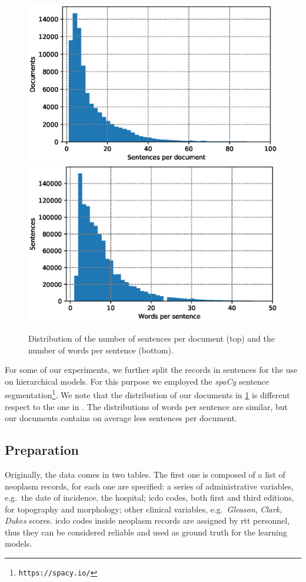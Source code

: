 \begin{figure}
  \centering
  \includegraphics[width=\floatwidth]{img/sentPerDoc.eps}
  \includegraphics[width=\floatwidth]{img/wordPerSent.eps}
  \caption{Distribution of the number of sentences per document (top)
    and the number of words per sentence (bottom).}
  \label{fig:wordsDist}
\end{figure}
For some of our experiments, we further split the records in sentences
for the use on hierarchical 
models. For this purpose we employed the \emph{spaCy} sentence
segmentation\footnote{\texttt{https://spacy.io/}}. We note that the
distribution of our documents in 
\cref{fig:wordsDist} is different respect to the one in
\cite{gao_hierarchical_2018}. The distributions of words per sentence
are similar, but our documents contains on average
less sentences per document.

\subsection{Preparation}
Originally, the data
comes in two tables. The first one is composed of
a list of
neoplasm records, for each one are specified: a series of
administrative variables, e.g.\ the date of incidence, the hospital;
\ac{icdo} codes, both first and third editions, for topography and
morphology; other clinical variables, e.g.\ \emph{Gleason},
\emph{Clark}, \emph{Dukes} scores.
\ac{icdo} codes inside neoplasm records are assigned by
\ac{rtt} personnel, thus they can be considered reliable and used as
ground truth for the learning models.

